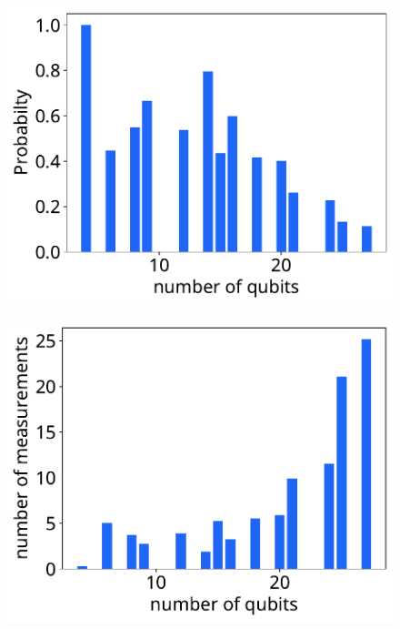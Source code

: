 \begin{figure}[H]
\centering
\begin{minipage}{.48\textwidth}
  \centering
	\includegraphics[width=\textwidth]{pictures/plots/prob/prob.pdf}
	\label{fig:probprob}
\end{minipage}%
\hfill
\begin{minipage}{.48\textwidth}
  \centering
  \includegraphics[width=\textwidth]{pictures/plots/prob/num.pdf}
	\label{fig:probnum}
\end{minipage}
\end{figure}

